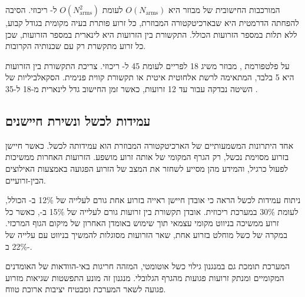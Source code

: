 המורכבות החישובית של  מבוזר היא $O(N_{\text{arms}})$ לעומת $O(N_{\text{arms}}^2)$ ל- ריכוזי. הסיבה להפחתה הדרמטית היא שבארכיטקטורה המבוזרת, כל זרוע פותרת בעיה מקומית בגודל קבוע, ללא תלות במספר הזרועות הכולל. התקשורת בין הזרועות היא לינארית במספר הזרועות, שכן כל זרוע מתקשרת רק עם שכנותיה הקרובות.

\begin{table}[htbp]
\centering
\caption{השוואת מורכבות חישובית:  ריכוזי לעומת  מבוזר לעומת  היררכי}
\label{tab:ch04_complexity}
\end{table}

על פלטפורמת ,  מבוזר משיג 18  לפריים לעומת 45  ל- ריכוזי. צריכת התקשורת בין הזרועות היא 5  בלבד, המתאימה לרשת אלחוטית איטית או תקשורת קווית פנימית. הסקאלביליות של השיטה נבדקה עבור עד 12 זרועות, כאשר זמן החישוב גדל לינארית מ-18  ל-35 .

\subsection{עמידות לכשל ונשירת חיישנים}
\label{sec:ch04_fault_tolerance}

אחד היתרונות המשמעותיים של הארכיטקטורה המבוזרת הוא עמידותה לכשל. כאשר חיישן בזרוע מסוימת נכשל, רק הגרף המקומי של אותה זרוע מושפע. הזרועות האחרות ממשיכות לפעול כרגיל, והמידע מהן מסייע לשחזר את המצב של הזרוע הפגועה באמצעות האילוצים הבין-זרועיים.

ניתוח עמידות לכשל הראה כי אובדן חיישן ראייה בזרוע אחת גורם לעלייה של 12\% ב- הכולל, לעומת 30\% במערכת ריכוזית. אובדן תקשורת בין זרועות גורם לעלייה של 15\% ב-, כאשר כל זרוע ממשיכה בניווט מקומי עצמאי תוך שימוש באומדן האחרון של מיקום הגוף המרכזי. במקרה של כשל מוחלט בזרוע אחת, שאר הזרועות מסוגלות להמשיך בניווט עם עלייה של 22\% ב-.

המערכת תומכת גם במנגנון גילוי כשל אוטומטי, המזהה חריגות באי-הוודאות של האומדנים המקומיים ומנתק זרועות פגועות מהגרף הגלובלי. מנגנון זה מונע התפשטות שגיאות מזרוע פגועה לשאר המערכת ומבטיח יציבות ארוכת טווח.

